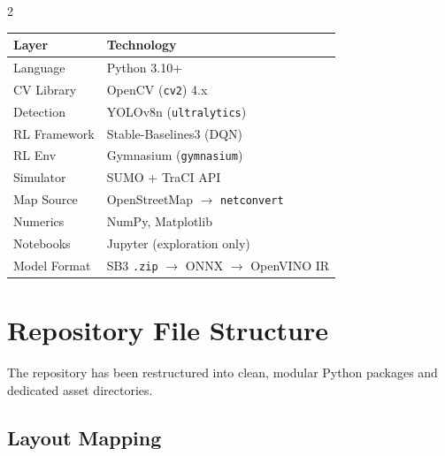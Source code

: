 \documentclass[10pt, a4paper]{article}
\begin{document}
\begin{multicols}{2}
\begin{center}
\small\color{monodark}
\begin{tabular}{@{}p{1.7cm} p{4.5cm}@{}}
\toprule
\textbf{Layer} & \textbf{Technology} \\
\midrule
Language     & Python 3.10+ \\
CV Library   & OpenCV (\texttt{cv2}) 4.x \\
Detection    & YOLOv8n (\texttt{ultralytics}) \\
RL Framework & Stable-Baselines3 (DQN) \\
RL Env       & Gymnasium (\texttt{gymnasium}) \\
Simulator    & SUMO + TraCI API \\
Map Source   & OpenStreetMap $\to$ \texttt{netconvert} \\
Numerics     & NumPy, Matplotlib \\
Notebooks    & Jupyter (exploration only) \\
Model Format & SB3 \texttt{.zip} $\to$ ONNX $\to$ OpenVINO IR \\
\bottomrule
\end{tabular}
\end{center}

\section{Repository File Structure}

The repository has been restructured into clean, modular Python packages
and dedicated asset directories.

\subsection{Layout Mapping}


\end{multicols}
\end{document}
